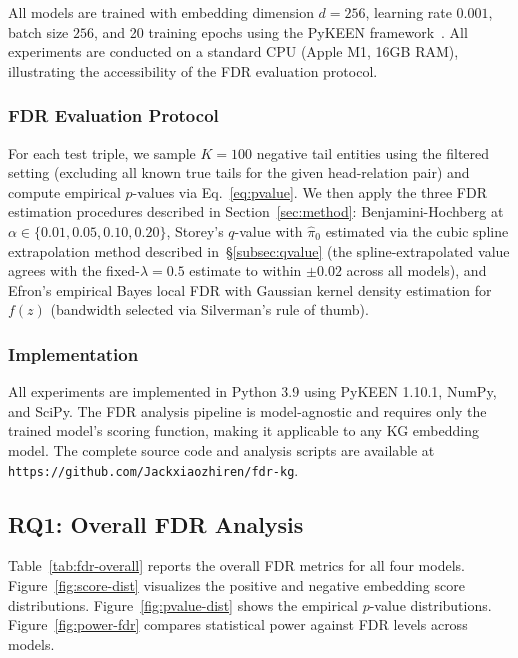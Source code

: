 All models are trained with embedding dimension $d = 256$, learning rate $0.001$, batch size $256$, and 20 training epochs using the PyKEEN framework~\cite{ali2021pykeen}.
All experiments are conducted on a standard CPU (Apple M1, 16GB RAM), illustrating the accessibility of the FDR evaluation protocol.

\subsubsection{FDR Evaluation Protocol}

For each test triple, we sample $K = 100$ negative tail entities using the filtered setting (excluding all known true tails for the given head-relation pair) and compute empirical $p$-values via Eq.~\ref{eq:pvalue}.
We then apply the three FDR estimation procedures described in Section~\ref{sec:method}:
Benjamini-Hochberg at $\alpha \in \{0.01, 0.05, 0.10, 0.20\}$, Storey's $q$-value with $\hat{\pi}_0$ estimated via the cubic spline extrapolation method described in~\S\ref{subsec:qvalue} (the spline-extrapolated value agrees with the fixed-$\lambda = 0.5$ estimate to within $\pm 0.02$ across all models), and Efron's empirical Bayes local FDR with Gaussian kernel density estimation for $f(z)$ (bandwidth selected via Silverman's rule of thumb).

\subsubsection{Implementation}

All experiments are implemented in Python 3.9 using PyKEEN 1.10.1, NumPy, and SciPy.
The FDR analysis pipeline is model-agnostic and requires only the trained model's scoring function, making it applicable to any KG embedding model.
The complete source code and analysis scripts are available at \texttt{https://github.com/Jackxiaozhiren/fdr-kg}.

\subsection{RQ1: Overall FDR Analysis}
\label{subsec:rq1}

Table~\ref{tab:fdr-overall} reports the overall FDR metrics for all four models.
Figure~\ref{fig:score-dist} visualizes the positive and negative embedding score distributions.
Figure~\ref{fig:pvalue-dist} shows the empirical $p$-value distributions.
Figure~\ref{fig:power-fdr} compares statistical power against FDR levels across models.

